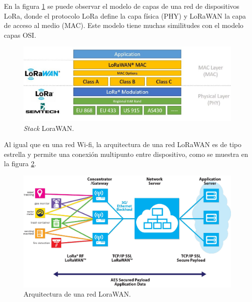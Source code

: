 En la figura \ref{fig:lorawanStack} se puede observar el modelo de capas de una red de dispositivos LoRa, donde el protocolo LoRa define la capa física (PHY) y LoRaWAN la capa de acceso al medio (MAC). Este modelo tiene muchas similitudes con el modelo capas OSI.

\begin{figure}[h]
	\centering
	\includegraphics[scale=0.35]{./Figures/lorawan.jpg}
	\caption{\textit{Stack} LoraWAN\protect\footnotemark.}
	\label{fig:lorawanStack}
\end{figure}


Al igual que en una red Wi-fi, la arquitectura de una red LoRaWAN es de tipo estrella y permite una conexión multipunto entre dispositivo, como se muestra en la figura \ref{fig:lorawanArch}.

\begin{figure}[h]
	\centering
	\includegraphics[scale=0.5]{./Figures/lorawan_architecture.pdf}
	\caption{Arquitectura de una red LoraWAN\protect\footnotemark.}
	\label{fig:lorawanArch}
\end{figure}


